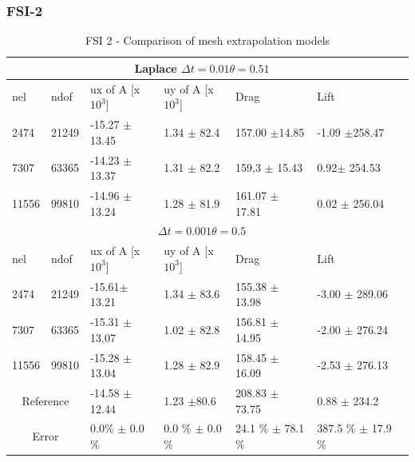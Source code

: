 \newpage
\subsubsection{FSI-2}

\begin{table}[h!]
\centering
\caption{FSI 2 - Comparison of mesh extrapolation models}
\label{my-label}
\begin{tabular}{ |p{1cm}||p{1cm}|p{2.7cm}|p{2.7cm}|p{2.9cm}|p{3.1cm}|p{1.2cm}|}
 \hline
  \multicolumn{6}{|c|}{Laplace \hspace{2mm} $\Delta t = 0.01 \theta = 0.51$} \\
   \hline
nel & ndof & ux of A [x $10^{3}$]  &uy of A [x $10^{3}$]& Drag  & Lift \\
 \hline
 2474    & 21249  & -15.27  $\pm$ 13.45 & 1.34  $\pm$  82.4 & 157.00  $\pm$14.85 & -1.09  $\pm$258.47 \\
 7307    & 63365  &   -14.23  $\pm$13.37 & 1.31   $\pm$ 82.2 & 159,3 $\pm$ 15.43 & 0.92$\pm$ 254.53  \\
 11556   & 99810  & -14.96 $\pm$ 13.24 & 1.28  $\pm$ 81.9 & 161.07 $\pm$  17.81 & 0.02  $\pm$ 256.04  \\
 \hline
  \multicolumn{6}{|c|}{$\Delta t = 0.001 \theta = 0.5$} \\
   \hline
 nel & ndof & ux of A [x $10^{3}$]  &uy of A [x $10^{3}$]& Drag  & Lift \\
    \hline
 2474    & 21249  & -15.61$\pm$  13.21 & 1.34  $\pm$ 83.6 & 155.38   $\pm$   13.98 & -3.00  $\pm$   289.06 \\
 7307    & 63365  & -15.31  $\pm$ 13.07 & 1.02    $\pm$  82.8 & 156.81  $\pm$  14.95 & -2.00   $\pm$   276.24 \\
 11556   & 99810  & -15.28   $\pm$  13.04 & 1.28 $\pm$ 82.9 & 158.45  $\pm$  16.09 & -2.53   $\pm$  276.13 \\
 \hline
  \multicolumn{2}{|c|}{Reference} & -14.58 $\pm$ 12.44   & 1.23 $\pm$80.6    & 208.83 $\pm$ 73.75 & 0.88 $\pm$ 234.2 \\
   \hline
    \multicolumn{2}{|c|}{Error}  & 0.0\% $\pm$ 0.0 \% & 0.0 \% $\pm$ 0.0 \% & 24.1 \% $\pm$ 78.1 \% & 387.5 \% $\pm$ 17.9 \%   \\
   \hline
\end{tabular}
\end{table}

